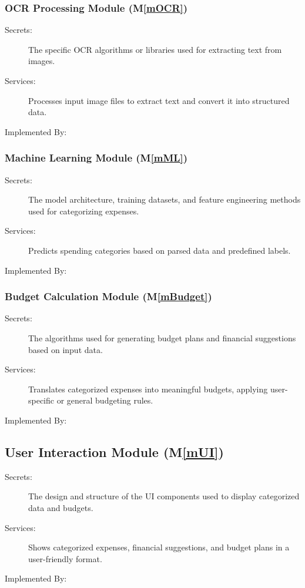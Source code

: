 \documentclass[12pt, titlepage]{article}
\newcommand{\mref}[1]{M\ref{#1}}
\begin{document}
\subsubsection{OCR Processing Module (\mref{mOCR})}

\begin{description}
\item[Secrets:] The specific OCR algorithms or libraries used for extracting text from images.
\item[Services:] Processes input image files to extract text and convert it into structured data.
\item[Implemented By:] \progname
\end{description}

\subsubsection{Machine Learning Module (\mref{mML})}

\begin{description}
\item[Secrets:] The model architecture, training datasets, and feature engineering methods used for categorizing expenses.
\item[Services:] Predicts spending categories based on parsed data and predefined labels.
\item[Implemented By:] \progname
\end{description}

\subsubsection{Budget Calculation Module (\mref{mBudget})}

\begin{description}
\item[Secrets:] The algorithms used for generating budget plans and financial suggestions based on input data.
\item[Services:] Translates categorized expenses into meaningful budgets, applying user-specific or general budgeting rules.
\item[Implemented By:] \progname
\end{description}

\subsection{User Interaction Module (\mref{mUI})}

\begin{description}
\item[Secrets:] The design and structure of the UI components used to display categorized data and budgets.
\item[Services:] Shows categorized expenses, financial suggestions, and budget plans in a user-friendly format.
\item[Implemented By:] \progname
\end{description}
\end{document}
